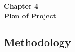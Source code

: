 \documentclass[12pt]{article}
\begin{document}
\vspace*{\fill}
\begin{center}
    {\Large \bf Chapter 4} \\[1em] %
    {\Large \bf Plan of Project}
\end{center}
\vspace*{\fill}

\newpage

\vspace{15pt} %

\setcounter{section}{4}

\newpage

\subsection{Methodology}

\vspace{10pt}
\end{document}
